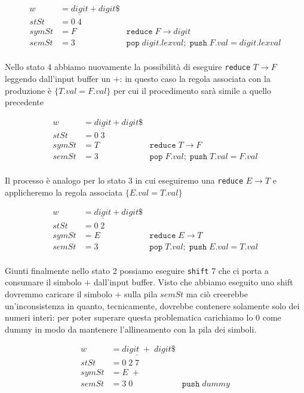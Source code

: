 \documentclass[class=book, crop=false, oneside, 12pt]{standalone}
\begin{document}
\begin{align*}
    w &= \underline{digit} + digit\$ \\
    stSt &= 0\; 4 \\
    symSt &= F &\texttt{reduce}\; F \to digit \\     
    semSt &= 3 &\texttt{pop}\;digit.lexval;\; \texttt{push}\;F.val = digit.lexval\\
\end{align*}

Nello stato 4 abbiamo nuovamente la possibilità di eseguire \texttt{reduce} \(T \to F\) leggendo dall'input buffer un \(+\): in questo caso la regola associata con la produzione è \(\{T.val = F.val\}\) per cui il procedimento sarà simile a quello precedente

\begin{align*}
    w &= \underline{digit} + digit\$ \\
    stSt &= 0\; 3 \\
    symSt &= T &\texttt{reduce}\; T \to F \\     
    semSt &= 3 &\texttt{pop}\;F.val;\; \texttt{push}\;T.val = F.val\\
\end{align*}

Il processo è analogo per lo stato 3 in cui eseguiremo una \texttt{reduce} \(E \to T\) e applicheremo la regola associata \(\{E.val = T.val\}\)

\begin{align*}
    w &= \underline{digit} + digit\$ \\
    stSt &= 0\; 2 \\
    symSt &= E &\texttt{reduce}\; E \to T \\     
    semSt &= 3 &\texttt{pop}\;T.val;\; \texttt{push}\;E.val = T.val \\
\end{align*}

Giunti finalmente nello stato 2 possiamo eseguire \texttt{shift} 7 che ci porta a consumare il simbolo \(+\) dall'input buffer. Visto che abbiamo eseguito uno shift dovremmo caricare il simbolo \(+\) sulla pila \(semSt\) ma ciò creerebbe un'inconsistenza in quanto, tecnicamente, dovrebbe contenere solamente solo dei numeri interi: per poter superare questa problematica carichiamo lo 0 come dummy in modo da mantenere l'allineamento con la pila dei simboli. 

\begin{align*}
    w &= \underline{digit \;+}\; digit\$ \\
    stSt &= 0\; 2\; 7 \\
    symSt &= E\; + \\     
    semSt &= 3\; 0 &\texttt{push}\;dummy\\
\end{align*}
\end{document}
